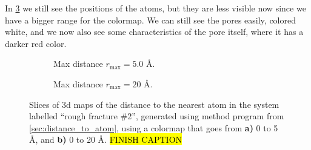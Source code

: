 In \cref{fig:distance_to_atom_r20} we still see the positions of the atoms, but they are less visible now since we have a bigger range for the colormap. We can still see the pores easily, colored white, and we now also see some characteristics of the pore itself, where it has a darker red color.
%
%
%
\begin{figure}[htpb]%
    \centering%
    \setlength{\myfigwidth}{0.9\textwidth}%
    \begin{subfigure}[b]{\myfigwidth}%
        \caption{Max distance $r_\text{max}=5.0$ \AA.%
        \label{fig:distance_to_atom_r05}}%
    \end{subfigure}%
    \vspace{10pt}
    \begin{subfigure}[b]{\myfigwidth}%
        \caption{Max distance $r_\text{max}=20$ \AA.%
        \label{fig:distance_to_atom_r20}}%
    \end{subfigure}%
    \caption{%
        Slices of 3d maps of the distance to the nearest atom in the system labelled ``rough fracture \#2'', generated using method program from \cref{sec:distance_to_atom}, using a colormap that goes from \textbf{a)} 0 to 5 \AA, and \textbf{b)} 0 to 20 \AA. \hl{FINISH CAPTION}%
    }%
\end{figure}%


